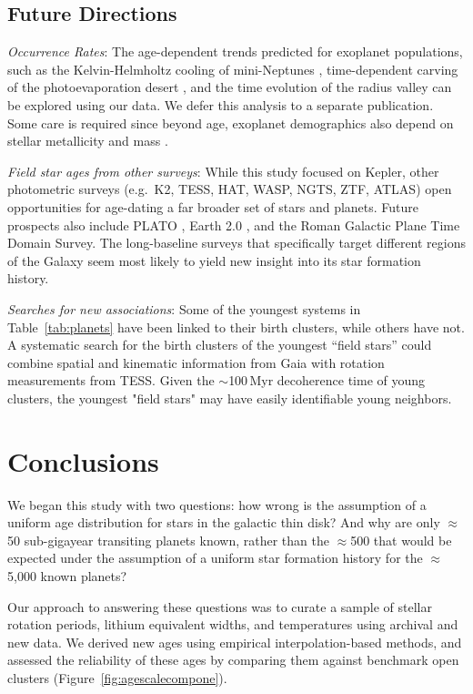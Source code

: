 \documentclass[11pt,twocolumn,tighten]{aastex63}
\begin{document}
\subsection{Future Directions}

{\it Occurrence Rates}:
The age-dependent trends predicted for exoplanet populations, such as
the Kelvin-Helmholtz cooling of mini-Neptunes \citep{Gupta_2019},
time-dependent carving of the photoevaporation desert
\citep{Owen2018}, and the time evolution of the radius valley
\citep{Rogers_2021} can be explored using our data.  We defer this
analysis to a separate publication.
Some care is required since beyond age,
exoplanet demographics also depend on stellar metallicity and mass
\citep[e.g.][]{Petigura_2018,Miyazaki2023}.  

{\it Field star ages from other surveys}:
While this study focused on
Kepler, other photometric surveys (e.g.~K2, TESS, HAT, WASP, NGTS, ZTF,
ATLAS) open opportunities for age-dating a far broader set
of stars and planets.
Future prospects also include PLATO
\citep{Rauer14}, Earth 2.0 \citep{2022arXiv220606693G}, and the Roman
Galactic Plane Time Domain Survey.
The long-baseline surveys 
that specifically target different regions of the Galaxy
seem most likely to yield new insight into its star
formation history.

{\it Searches for new associations}:
Some of the youngest systems in Table~\ref{tab:planets} have been
linked to their birth clusters, while others have not. A systematic
search for the birth clusters of the youngest ``field stars'' could
combine spatial and kinematic information from Gaia with rotation
measurements from TESS. Given the $\sim$100\,Myr decoherence time of
young clusters, the youngest "field stars" may have easily
identifiable young neighbors.



\section{Conclusions}
\label{sec:conclusions}

We began this study with two questions: how wrong is the assumption
of a uniform age distribution for stars in the galactic thin disk?
And why are only $\approx$50 sub-gigayear transiting planets known,
rather than the $\approx$500 that would be expected under the
assumption of a uniform star formation history for the
$\approx$5{,}000 known planets?

Our approach to answering these questions was to curate a sample of
stellar rotation periods, lithium equivalent widths, and temperatures
using archival and new data.  We derived new ages using empirical
interpolation-based methods, and assessed the reliability of these ages
by comparing them against benchmark open clusters
(Figure~\ref{fig:agescalecompone}).
\end{document}
